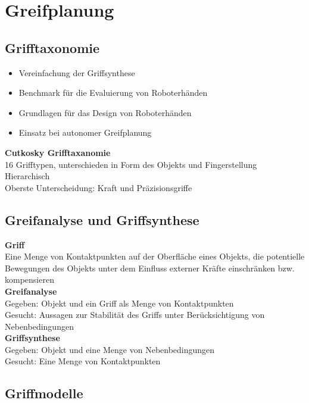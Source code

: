 

\section{Greifplanung}%
\label{gpl:sec:greifplanung}

\subsection{Grifftaxonomie}%
\label{gpl:sub:grifftaxonomie}
\begin{itemize}
\item Vereinfachung der Griffsynthese
\item Benchmark für die Evaluierung von Roboterhänden
\item Grundlagen für das Design von Roboterhänden
\item Einsatz bei autonomer Greifplanung
\end{itemize}

\textbf{Cutkosky Grifftaxanomie}\\
16 Grifftypen, unterschieden in Form des Objekts und Fingerstellung\\
Hierarchisch\\
Oberste Unterscheidung: Kraft und Präzisionsgriffe

\subsection{Greifanalyse und Griffsynthese}%
\label{gpl:sub:greifanalyse-griffsynthese}
\textbf{Griff}\\
Eine Menge von Kontaktpunkten auf der Oberfläche eines Objekts, die potentielle Bewegungen des Objekts unter dem
Einfluss externer Kräfte einschränken bzw. kompensieren\\

\textbf{Greifanalyse}\\
Gegeben: Objekt und ein Griff als Menge von Kontaktpunkten\\
Gesucht: Aussagen zur Stabilität des Griffs unter Berücksichtigung von Nebenbedingungen\\

\textbf{Griffsynthese}\\
Gegeben: Objekt und eine Menge von Nebenbedingungen\\
Gesucht: Eine Menge von Kontaktpunkten

\subsection{Griffmodelle}%
\label{gpl:sub:griffmodelle}

